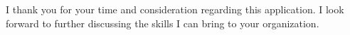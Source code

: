 \documentclass[11pt, a4paper]{awesome-cv}
\begin{document}
\begin{cvletter}
I thank you for your time and consideration regarding this application. I look forward to further discussing the skills I can bring to your organization.



\end{cvletter}


\makeletterclosing
\end{document}
